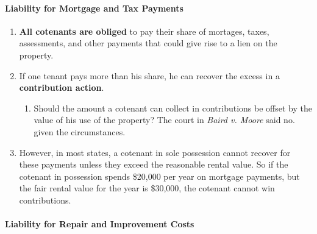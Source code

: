 \paragraph{Liability for Mortgage and Tax Payments}

\begin{enumerate}
    \item \textbf{All cotenants are obliged} to pay their share of mortages, 
    taxes, assessments, and other payments that could give rise to a lien on 
    the property.
    \item If one tenant pays more than his share, he can recover the excess in 
    a \textbf{contribution action}.
    \begin{enumerate}
        \item Should the amount a cotenant can collect in contributions be 
        offset by the value of his use of the property? The court in 
        \emph{Baird v. Moore} said no. given the circumstances.
    \end{enumerate}
    \item However, in most states, a cotenant in sole possession cannot 
    recover for these payments unless they exceed the reasonable rental value. 
    So if the cotenant in possession spends \$20,000 per year on mortgage 
    payments, but the fair rental value for the year is \$30,000, the cotenant 
    cannot win contributions.
\end{enumerate}

\paragraph{Liability for Repair and Improvement Costs}

